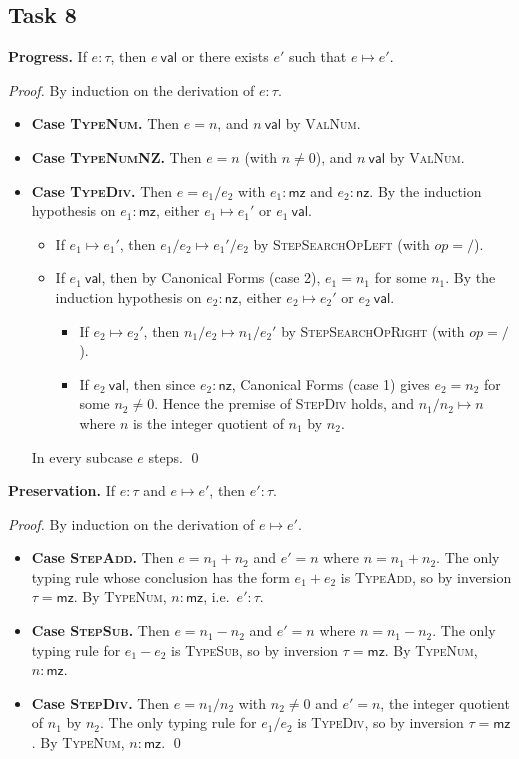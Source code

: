 \documentclass[11pt]{article}
\newcommand{\val}{\ \mathsf{val}}
\newcommand{\step}{\mapsto}
\newcommand{\kw}[1]{\mathsf{#1}}
\newcommand{\nz}{\kw{nz}}
\newcommand{\mz}{\kw{mz}}
\newcommand{\rn}[1]{\textsc{#1}}
\newenvironment{task}[1]{\subsection*{#1}}{}
\begin{document}
\begin{task}{Task 8}
\textbf{Progress.} If $e:\tau$, then $e \val$ or there exists $e'$ such that $e \step e'$.

\emph{Proof.} By induction on the derivation of $e:\tau$.
\begin{itemize}[leftmargin=*]
\item \textbf{Case \rn{TypeNum}.} Then $e = n$, and $n \val$ by \rn{ValNum}.

\item \textbf{Case \rn{TypeNumNZ}.} Then $e = n$ (with $n \neq 0$), and $n \val$ by \rn{ValNum}.

\item \textbf{Case \rn{TypeDiv}.} Then $e = e_1 / e_2$ with $e_1:\mz$ and $e_2:\nz$.
  By the induction hypothesis on $e_1 : \mz$, either $e_1 \step e_1'$ or $e_1 \val$.
  \begin{itemize}
  \item If $e_1 \step e_1'$, then $e_1/e_2 \step e_1'/e_2$ by \rn{StepSearchOpLeft}
    (with $op = /$).
  \item If $e_1 \val$, then by Canonical Forms (case 2), $e_1 = n_1$ for some $n_1$.
    By the induction hypothesis on $e_2:\nz$, either $e_2 \step e_2'$ or $e_2 \val$.
    \begin{itemize}
    \item If $e_2 \step e_2'$, then $n_1/e_2 \step n_1/e_2'$ by \rn{StepSearchOpRight}
      (with $op = /$).
    \item If $e_2 \val$, then since $e_2 : \nz$, Canonical Forms (case 1) gives
      $e_2 = n_2$ for some $n_2 \neq 0$. Hence the premise of \rn{StepDiv} holds, and
      $n_1 / n_2 \step n$ where $n$ is the integer quotient of $n_1$ by $n_2$.
    \end{itemize}
  \end{itemize}
  In every subcase $e$ steps. \qed
\end{itemize}

\bigskip
\textbf{Preservation.} If $e:\tau$ and $e \step e'$, then $e':\tau$.

\emph{Proof.} By induction on the derivation of $e \step e'$.
\begin{itemize}[leftmargin=*]
\item \textbf{Case \rn{StepAdd}.} Then $e = n_1 + n_2$ and $e' = n$ where $n = n_1 + n_2$.
  The only typing rule whose conclusion has the form $e_1 + e_2$ is \rn{TypeAdd},
  so by inversion $\tau = \mz$. By \rn{TypeNum}, $n : \mz$, i.e.\ $e' : \tau$.

\item \textbf{Case \rn{StepSub}.} Then $e = n_1 - n_2$ and $e' = n$ where $n = n_1 - n_2$.
  The only typing rule for $e_1 - e_2$ is \rn{TypeSub}, so by inversion $\tau = \mz$.
  By \rn{TypeNum}, $n : \mz$.

\item \textbf{Case \rn{StepDiv}.} Then $e = n_1 / n_2$ with $n_2 \neq 0$ and $e' = n$, the
  integer quotient of $n_1$ by $n_2$. The only typing rule for $e_1 / e_2$ is
  \rn{TypeDiv}, so by inversion $\tau = \mz$. By \rn{TypeNum}, $n : \mz$. \qed
\end{itemize}
\end{task}
\end{document}
